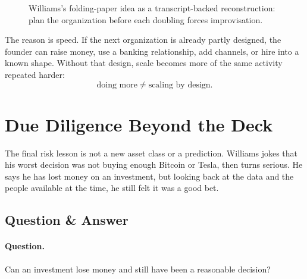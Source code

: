 \documentclass[11pt,oneside]{book}
\begin{document}
\begin{figure}
\centering
{}
\caption{Williams's folding-paper idea as a transcript-backed reconstruction: plan the organization before each doubling forces improvisation.}
\end{figure}

The reason is speed. If the next organization is already partly designed, the founder can raise money, use a banking relationship, add channels, or hire into a known shape. Without that design, scale becomes more of the same activity repeated harder:
\[
\text{doing more}
\neq
\text{scaling by design}.
\]

\section{Due Diligence Beyond the Deck}

The final risk lesson is not a new asset class or a prediction. Williams jokes that his worst decision was not buying enough Bitcoin or Tesla, then turns serious. He says he has lost money on an investment, but looking back at the data and the people available at the time, he still felt it was a good bet.

\subsection{Question \& Answer}

\paragraph{Question.}
Can an investment lose money and still have been a reasonable decision?
\end{document}

